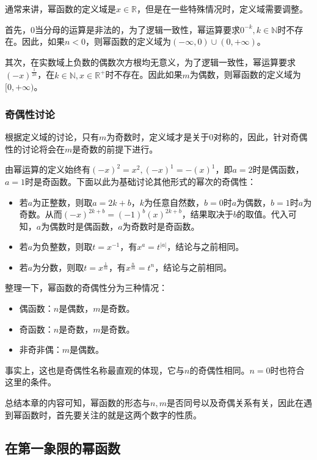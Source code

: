 通常来讲，幂函数的定义域是$x\in\mathbb{R}$，但是在一些特殊情况时，定义域需要调整。

首先，$0$当分母的运算是非法的，为了逻辑一致性，幂运算要求$0^{-k},k\in \mathbb{N}$时不存在。因此，如果$n<0$，则幂函数的定义域为$({-\infty},0)\cup(0,{+\infty})$。

其次，在实数域上负数的偶数次方根均无意义，为了逻辑一致性，幂运算要求$\displaystyle(-x)^\frac{1}{2k}$，在$k\in \mathbb{N},x\in\mathbb{R}^+$时不存在。因此如果${m}$为偶数，则幂函数的定义域为$[0,{+\infty})$。

\subsubsection{奇偶性讨论}

根据定义域的讨论，只有$m$为奇数时，定义域才是关于$0$对称的，因此，针对奇偶性的讨论将会在$m$是奇数的前提下进行。

由幂运算的定义始终有$(-x)^2=x^2,(-x)^1=-(x)^1$，即$a=2$时是偶函数，$a=1$时是奇函数。下面以此为基础讨论其他形式的幂次的奇偶性：

\begin{itemize}
\item 若$a$为正整数，则取$a=2k+b$，$k$为任意自然数，$b=0$时$a$为偶数，$b=1$时$a$为奇数。从而$(-x)^{2k+b}=(-1)^b(x)^{2k+b}$，结果取决于$b$的取值。代入可知，$a$为偶数时是偶函数，$a$为奇数时是奇函数。
\item 若$a$为负整数，则取$t=x^{-1}$，有$x^a=t^{|a|}$，结论与之前相同。
\item 若$a$为分数，则取$t=x^\frac{1}{m}$，有$x^\frac{n}{m}=t^{n}$，结论与之前相同。
\end{itemize}

整理一下，幂函数的奇偶性分为三种情况：

\begin{itemize}
\item 偶函数：$n$是偶数，$m$是奇数。
\item 奇函数：$n$是奇数，$m$是奇数。
\item 非奇非偶：$m$是偶数。
\end{itemize}

事实上，这也是奇偶性名称最直观的体现，它与$n$的奇偶性相同。$n=0$时也符合这里的条件。

总结本章的内容可知，幂函数的形态与$n,m$是否同号以及奇偶关系有关，因此在遇到幂函数时，首先要关注的就是这两个数字的性质。

\subsection{在第一象限的幂函数}

